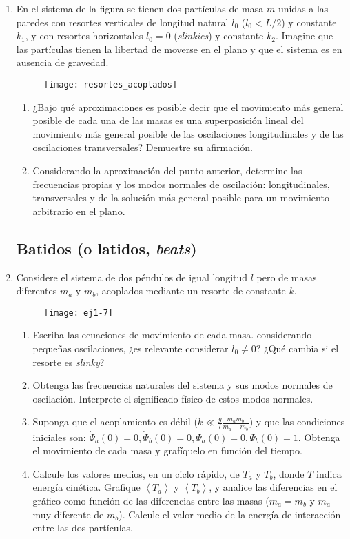 \documentclass[11pt,spanish,a4paper]{article}
\begin{document}
\begin{enumerate}
\item En el sistema de la figura se tienen dos partículas de masa $m$ unidas a las paredes con resortes verticales de longitud natural $l_0$ ($l_0< L/2$) y constante $k_1$, y con resortes horizontales $l_0= 0$ (\emph{slinkies}) y constante $k_2$.
Imagine que las partículas tienen la libertad de moverse en el plano y que el sistema es en ausencia de gravedad.
\begin{figure}[h]
\centering{}\texttt{[image: resortes\_acoplados]}
\end{figure}
\begin{enumerate}
    \item ¿Bajo qué aproximaciones es posible decir que el movimiento más general posible de cada una de las masas es una superposición lineal del movimiento más general posible de las oscilaciones longitudinales y de las oscilaciones transversales? Demuestre su afirmación.
    \item Considerando la aproximación del punto anterior, determine las frecuencias propias y los modos normales de oscilación: longitudinales, transversales y de la solución más general posible para un movimiento arbitrario en el plano.
\end{enumerate}

\subsection*{Batidos (o latidos, \emph{beats})}

\item \label{pendacop} Considere el sistema de dos péndulos de igual longitud $l$ pero de masas diferentes $m_{a}$ y $m_{b}$, acoplados mediante un resorte
de constante $k$.
\begin{figure}[h]
\centering{}\texttt{[image: ej1-7]}
\end{figure}


\begin{enumerate}
	\item Escriba las ecuaciones de movimiento de cada masa. considerando pequeñas oscilaciones, ¿es relevante considerar $l_0\neq0$? ¿Qué cambia si el resorte es \emph{slinky}?   
	\item Obtenga las frecuencias naturales del sistema y sus modos normales de oscilación.
Interprete el significado físico de estos modos normales. 
	\item Suponga que el acoplamiento es débil ($k\ll\frac{g}{l}\frac{m_{a}m_{b}}{m_{a}+m_{b}}$) y que las condiciones iniciales son: $\dot{\Psi}_{a}(0)=0,\dot{\Psi}_{b}(0)=0,\Psi_{a}(0)=0,\Psi_{b}(0)=1$.
Obtenga el movimiento de cada masa y grafíquelo en función del tiempo.
	\item Calcule los valores medios, en un ciclo rápido, de $T_{a}$ y $T_{b}$, donde $T$ indica energía cinética. Grafique $\left\langle T_{a}\right\rangle $ y $\left\langle T_{b}\right\rangle $, y analice las diferencias en el gráfico como función de las diferencias entre las masas ($m_{a}=m_{b}$ y $m_{a}$ muy diferente de $m_{b}$).
Calcule el valor medio de la energía de interacción entre las dos partículas.
\end{enumerate}



\end{enumerate}
\end{document}
